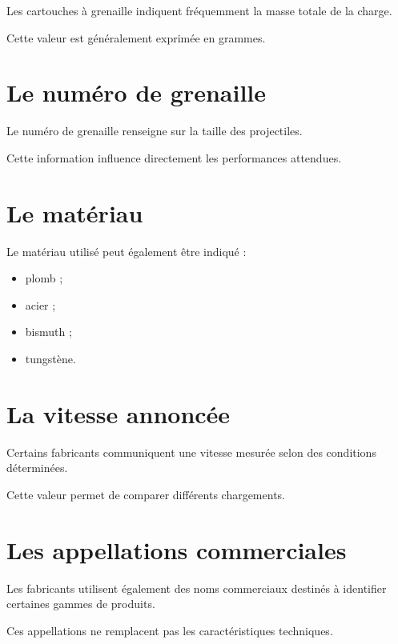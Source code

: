 Les cartouches à grenaille indiquent fréquemment la masse totale de la charge.

Cette valeur est généralement exprimée en grammes.

\section{Le numéro de grenaille}

Le numéro de grenaille renseigne sur la taille des projectiles.

Cette information influence directement les performances attendues.

\section{Le matériau}

Le matériau utilisé peut également être indiqué :

\begin{itemize}
    \item plomb ;
    \item acier ;
    \item bismuth ;
    \item tungstène.
\end{itemize}

\section{La vitesse annoncée}

Certains fabricants communiquent une vitesse mesurée selon des conditions
déterminées.

Cette valeur permet de comparer différents chargements.

\section{Les appellations commerciales}

Les fabricants utilisent également des noms commerciaux destinés à identifier
certaines gammes de produits.

Ces appellations ne remplacent pas les caractéristiques techniques.

